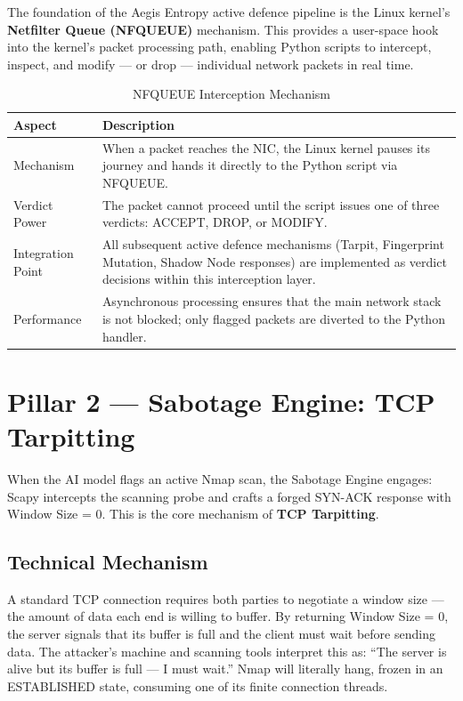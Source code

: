 \documentclass[12pt,a4paper]{report}
\begin{document}
The foundation of the Aegis Entropy active defence pipeline is the Linux kernel's
\textbf{Netfilter Queue (NFQUEUE)} mechanism. This provides a user-space hook into the
kernel's packet processing path, enabling Python scripts to intercept, inspect, and modify
--- or drop --- individual network packets in real time.

\begin{table}[h!]
\centering
\caption{NFQUEUE Interception Mechanism}
\begin{tabular}{@{}L{3cm} L{11.5cm}@{}}
  \toprule
  \textbf{Aspect} & \textbf{Description} \\
  \midrule
  Mechanism
    & When a packet reaches the NIC, the Linux kernel pauses its journey and hands it
      directly to the Python script via NFQUEUE. \\
  \addlinespace
  Verdict Power
    & The packet cannot proceed until the script issues one of three verdicts: ACCEPT,
      DROP, or MODIFY. \\
  \addlinespace
  Integration Point
    & All subsequent active defence mechanisms (Tarpit, Fingerprint Mutation, Shadow
      Node responses) are implemented as verdict decisions within this interception layer. \\
  \addlinespace
  Performance
    & Asynchronous processing ensures that the main network stack is not blocked; only
      flagged packets are diverted to the Python handler. \\
  \bottomrule
\end{tabular}
\label{tab:nfqueue}
\end{table}

\chapter{Pillar 2 --- Sabotage Engine: TCP Tarpitting}

When the AI model flags an active Nmap scan, the Sabotage Engine engages: Scapy
intercepts the scanning probe and crafts a forged SYN-ACK response with Window Size = 0.
This is the core mechanism of \textbf{TCP Tarpitting}.

\section{Technical Mechanism}

A standard TCP connection requires both parties to negotiate a window size --- the amount of
data each end is willing to buffer. By returning Window Size = 0, the server signals that its
buffer is full and the client must wait before sending data. The attacker's machine and
scanning tools interpret this as: ``The server is alive but its buffer is full --- I must wait.''
Nmap will literally hang, frozen in an ESTABLISHED state, consuming one of its finite
connection threads.
\end{document}
